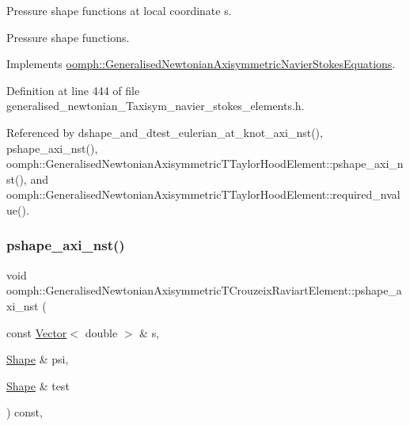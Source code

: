 Pressure shape functions at local coordinate s. 

Pressure shape functions. 

Implements \hyperlink{classoomph_1_1GeneralisedNewtonianAxisymmetricNavierStokesEquations_a45e6df6b18daa524c32659572470cc7b}{oomph\+::\+Generalised\+Newtonian\+Axisymmetric\+Navier\+Stokes\+Equations}.



Definition at line 444 of file generalised\+\_\+newtonian\+\_\+\+Taxisym\+\_\+navier\+\_\+stokes\+\_\+elements.\+h.



Referenced by dshape\+\_\+and\+\_\+dtest\+\_\+eulerian\+\_\+at\+\_\+knot\+\_\+axi\+\_\+nst(), pshape\+\_\+axi\+\_\+nst(), oomph\+::\+Generalised\+Newtonian\+Axisymmetric\+T\+Taylor\+Hood\+Element\+::pshape\+\_\+axi\+\_\+nst(), and oomph\+::\+Generalised\+Newtonian\+Axisymmetric\+T\+Taylor\+Hood\+Element\+::required\+\_\+nvalue().

\mbox{\label{classoomph_1_1GeneralisedNewtonianAxisymmetricTCrouzeixRaviartElement_a5b3ab448ee65204076afc4009bd53f59}} 
\subsubsection{\texorpdfstring{pshape\+\_\+axi\+\_\+nst()}{pshape\_axi\_nst()}\hspace{0.1cm}{\footnotesize\ttfamily [2/2]}}
{\footnotesize\ttfamily void oomph\+::\+Generalised\+Newtonian\+Axisymmetric\+T\+Crouzeix\+Raviart\+Element\+::pshape\+\_\+axi\+\_\+nst (\begin{DoxyParamCaption}\item[{const \hyperlink{classoomph_1_1Vector}{Vector}$<$ double $>$ \&}]{s,  }\item[{\hyperlink{classoomph_1_1Shape}{Shape} \&}]{psi,  }\item[{\hyperlink{classoomph_1_1Shape}{Shape} \&}]{test }\end{DoxyParamCaption}) const\hspace{0.3cm}{\ttfamily [inline]}, {\ttfamily [virtual]}}



